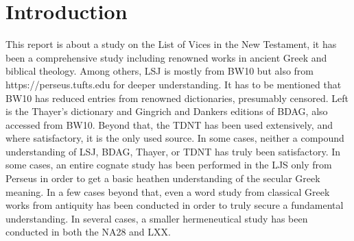 \section{Introduction}

This report is about a study on the List of Vices in the New Testament, it has been a comprehensive study including renowned works in ancient Greek and biblical theology. Among others, LSJ is mostly from BW10 but also from https://perseus.tufts.edu for deeper understanding. It has to be mentioned that BW10 has reduced entries from renowned dictionaries, presumably censored. Left is the Thayer's dictionary and Gingrich and Dankers editions of BDAG, also accessed from BW10. Beyond that, the TDNT has been used extensively, and where satisfactory, it is the only used source. In some cases, neither a compound understanding of LSJ, BDAG, Thayer, or TDNT has truly been satisfactory. In some cases, an entire cognate study has been performed in the LJS only from Perseus in order to get a basic heathen understanding of the secular Greek meaning. In a few cases beyond that, even a word study from classical Greek works from antiquity has been conducted in order to truly secure a fundamental understanding. In several cases, a smaller hermeneutical study has been conducted in both the NA28 and LXX.

% 

